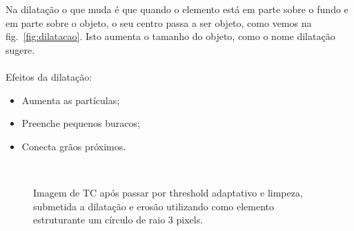 Na dilatação o que muda é que quando o elemento está em parte sobre o fundo e em parte sobre o objeto, o seu centro passa a ser objeto, como vemos na fig.~\ref{fig:dilatacao}. Isto aumenta o tamanho do objeto, como o nome dilatação sugere.
\\ \\
Efeitos da dilatação:

\begin{itemize}
 \item Aumenta as partículas;
 \item Preenche pequenos buracos;
 \item Conecta grãos próximos.
\end{itemize}

\begin{figure}[ht]
 \begin{center}
  \\
 \end{center}
 \caption{Imagem de TC após passar por threshold adaptativo e limpeza, submetida a dilatação e erosão utilizando como elemento estruturante um círculo de raio 3 pixels.}
 \label{fig:erosao_dilatacao}
\end{figure}

